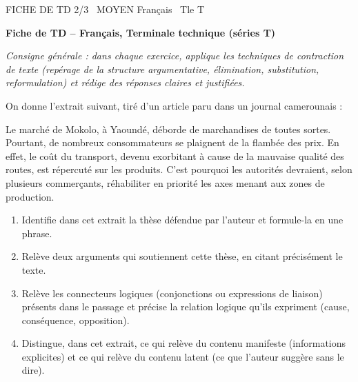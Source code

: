 \documentclass[11pt]{article}
\begin{document}
\begin{tcolorbox}[enhanced,colback=popink,colframe=popink,arc=10pt,boxrule=0pt,left=12pt,right=12pt,top=9pt,bottom=9pt]
{\color{white}\popxbold\small FICHE DE TD 2/3 \textbullet\ MOYEN \hfill Français \textbullet\ Tle T\par}
\end{tcolorbox}
\vspace{4pt}
\textbf{Fiche de TD -- Français, Terminale technique (séries T)}

\textit{Consigne générale : dans chaque exercice, applique les techniques de contraction de texte (repérage de la structure argumentative, élimination, substitution, reformulation) et rédige des réponses claires et justifiées.}

\begin{exercice}
On donne l'extrait suivant, tiré d'un article paru dans un journal camerounais :

\og Le marché de Mokolo, à Yaoundé, déborde de marchandises de toutes sortes. Pourtant, de nombreux consommateurs se plaignent de la flambée des prix. En effet, le coût du transport, devenu exorbitant à cause de la mauvaise qualité des routes, est répercuté sur les produits. C'est pourquoi les autorités devraient, selon plusieurs commerçants, réhabiliter en priorité les axes menant aux zones de production. \fg

\begin{enumerate}
\item Identifie dans cet extrait la thèse défendue par l'auteur et formule-la en une phrase.
\item Relève deux arguments qui soutiennent cette thèse, en citant précisément le texte.
\item Relève les connecteurs logiques (conjonctions ou expressions de liaison) présents dans le passage et précise la relation logique qu'ils expriment (cause, conséquence, opposition).
\item Distingue, dans cet extrait, ce qui relève du contenu manifeste (informations explicites) et ce qui relève du contenu latent (ce que l'auteur suggère sans le dire).
\end{enumerate}
\end{exercice}
\end{document}
